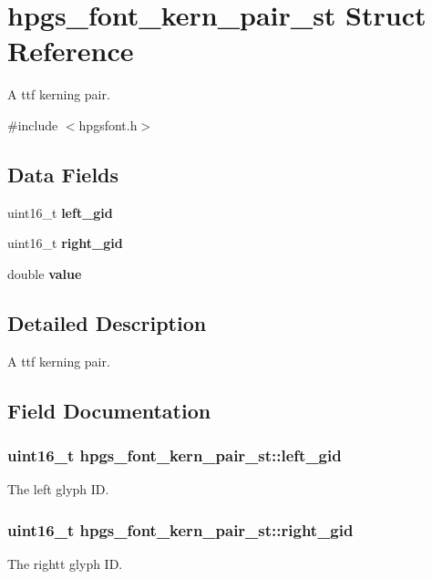 \section{hpgs\_\-font\_\-kern\_\-pair\_\-st Struct Reference}
\label{structhpgs__font__kern__pair__st}


A ttf kerning pair.  




{\ttfamily \#include $<$hpgsfont.h$>$}

\subsection*{Data Fields}
\begin{DoxyCompactItemize}
\item 
uint16\_\-t {\bf left\_\-gid}
\item 
uint16\_\-t {\bf right\_\-gid}
\item 
double {\bf value}
\end{DoxyCompactItemize}


\subsection{Detailed Description}
A ttf kerning pair. 

\subsection{Field Documentation}
\subsubsection[{left\_\-gid}]{\setlength{\rightskip}{0pt plus 5cm}uint16\_\-t {\bf hpgs\_\-font\_\-kern\_\-pair\_\-st::left\_\-gid}}\label{structhpgs__font__kern__pair__st_a7f872ad15661ae1d46be65cdf9d720a5}
The left glyph ID. 
\subsubsection[{right\_\-gid}]{\setlength{\rightskip}{0pt plus 5cm}uint16\_\-t {\bf hpgs\_\-font\_\-kern\_\-pair\_\-st::right\_\-gid}}\label{structhpgs__font__kern__pair__st_a54b869c6f5ab7fc34afe284ef374ecde}
The rightt glyph ID. 
